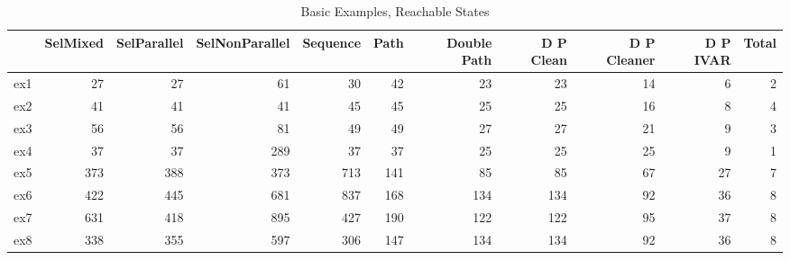 \begin{table}
\centering
\caption{Basic Examples, Reachable States}
\label{b_e_reach}
\begin{tabular}{lrrrrrrrrrr}
\toprule
{} &  SelMixed &  SelParallel &  SelNonParallel &  Sequence &  Path &  Double Path &  D P Clean &  D P Cleaner &  D P IVAR &  Total \\
\midrule
ex1 &        27 &           27 &              61 &        30 &    42 &           23 &         23 &           14 &         6 &      2 \\
ex2 &        41 &           41 &              41 &        45 &    45 &           25 &         25 &           16 &         8 &      4 \\
ex3 &        56 &           56 &              81 &        49 &    49 &           27 &         27 &           21 &         9 &      3 \\
ex4 &        37 &           37 &             289 &        37 &    37 &           25 &         25 &           25 &         9 &      1 \\
ex5 &       373 &          388 &             373 &       713 &   141 &           85 &         85 &           67 &        27 &      7 \\
ex6 &       422 &          445 &             681 &       837 &   168 &          134 &        134 &           92 &        36 &      8 \\
ex7 &       631 &          418 &             895 &       427 &   190 &          122 &        122 &           95 &        37 &      8 \\
ex8 &       338 &          355 &             597 &       306 &   147 &          134 &        134 &           92 &        36 &      8 \\
\bottomrule
\end{tabular}
\end{table}
